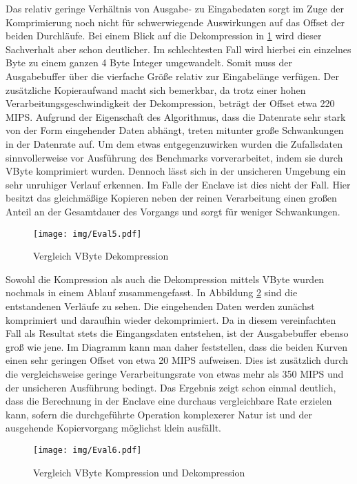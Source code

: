 Das relativ geringe Verhältnis von Ausgabe- zu Eingabedaten sorgt im Zuge der Komprimierung noch nicht für schwerwiegende Auswirkungen auf das Offset der beiden Durchläufe. Bei einem Blick auf die Dekompression in \ref{fig:eval5} wird dieser Sachverhalt aber schon deutlicher. Im schlechtesten Fall wird hierbei ein einzelnes Byte zu einem ganzen 4 Byte Integer umgewandelt. Somit muss der Ausgabebuffer über die vierfache Größe relativ zur Eingabelänge verfügen. Der zusätzliche Kopieraufwand macht sich bemerkbar, da trotz einer hohen Verarbeitungsgeschwindigkeit der Dekompression, beträgt der Offset etwa 220 \ac{MIPS}. Aufgrund der Eigenschaft des Algorithmus, dass die Datenrate sehr stark von der Form eingehender Daten abhängt, treten mitunter große Schwankungen in der Datenrate auf. Um dem etwas entgegenzuwirken wurden die Zufallsdaten sinnvollerweise vor Ausführung des Benchmarks vorverarbeitet, indem sie durch VByte komprimiert wurden. Dennoch lässt sich in der unsicheren Umgebung ein sehr unruhiger Verlauf erkennen. Im Falle der Enclave ist dies nicht der Fall. Hier besitzt das gleichmäßige Kopieren neben der reinen Verarbeitung einen großen Anteil an der Gesamtdauer des Vorgangs und sorgt für weniger Schwankungen.

\begin{figure}[h]
	\texttt{[image: img/Eval5.pdf]}
	\centering
	\caption{Vergleich VByte Dekompression}
	\label{fig:eval5}
\end{figure}

Sowohl die Kompression als auch die Dekompression mittels VByte wurden nochmals in einem Ablauf zusammengefasst. In Abbildung \ref{fig:eval6} sind die entstandenen Verläufe zu sehen. Die eingehenden Daten werden zunächst komprimiert und daraufhin wieder dekomprimiert. Da in diesem vereinfachten Fall als Resultat stets die Eingangsdaten entstehen, ist der Ausgabebuffer ebenso groß wie jene. Im Diagramm kann man daher feststellen, dass die beiden Kurven einen sehr geringen Offset von etwa 20 \ac{MIPS} aufweisen. Dies ist zusätzlich durch die vergleichsweise geringe Verarbeitungsrate von etwas mehr als 350 \ac{MIPS} und der unsicheren Ausführung bedingt. Das Ergebnis zeigt schon einmal deutlich, dass die Berechnung in der Enclave eine durchaus vergleichbare Rate erzielen kann, sofern die durchgeführte Operation komplexerer Natur ist und der ausgehende Kopiervorgang möglichst klein ausfällt.

\begin{figure}[h]
	\texttt{[image: img/Eval6.pdf]}
	\centering
	\caption{Vergleich VByte Kompression und Dekompression}
	\label{fig:eval6}
\end{figure}

